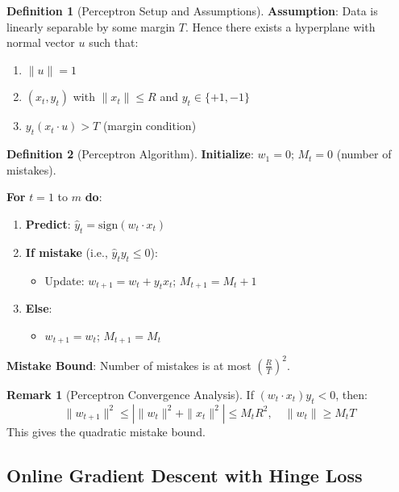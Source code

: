 \documentclass[12pt,a4paper]{article}
\theoremstyle{definition}
\newtheorem{definition}{Definition}[section]
\newtheorem{remark}{Remark}[section]
\begin{document}
\begin{definition}[Perceptron Setup and Assumptions]
\textbf{Assumption}: Data is linearly separable by some margin $T$. Hence there exists a hyperplane with normal vector $u$ such that:
\begin{enumerate}
    \item $\|u\| = 1$
    \item $(x_t, y_t)$ with $\|x_t\| \leq R$ and $y_t \in \{+1, -1\}$
    \item $y_t(x_t \cdot u) > T$ (margin condition)
\end{enumerate}
\end{definition}

\begin{definition}[Perceptron Algorithm]
\textbf{Initialize}: $w_1 = 0$; $M_t = 0$ (number of mistakes).

\textbf{For } $t = 1$ to $m$ \textbf{ do}:
\begin{enumerate}
    \item \textbf{Predict}: $\hat{y}_t = \text{sign}(w_t \cdot x_t)$
    \item \textbf{If mistake} (i.e., $\hat{y}_t y_t \leq 0$):
    \begin{itemize}
        \item Update: $w_{t+1} = w_t + y_t x_t$; $M_{t+1} = M_t + 1$
    \end{itemize}
    \item \textbf{Else}:
    \begin{itemize}
        \item $w_{t+1} = w_t$; $M_{t+1} = M_t$
    \end{itemize}
\end{enumerate}

\textbf{Mistake Bound}: Number of mistakes is at most $\left(\frac{R}{T}\right)^2$.
\end{definition}

\begin{remark}[Perceptron Convergence Analysis]
If $(w_t \cdot x_t)y_t < 0$, then:
\[
\|w_{t+1}\|^2 \leq |\|w_t\|^2 + \|x_t\|^2| \leq M_t R^2, \quad \|w_t\| \geq M_t T
\]
This gives the quadratic mistake bound.
\end{remark}

\subsection{Online Gradient Descent with Hinge Loss}
\end{document}
